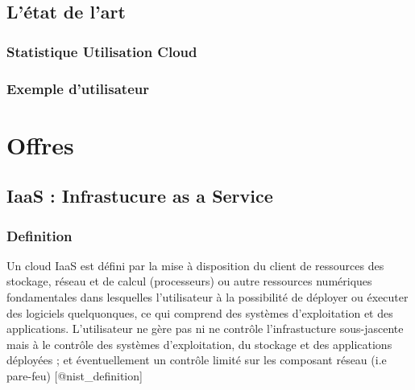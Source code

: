 \documentclass[11pt]{book}
\begin{document}
\subsection{L'état de l'art}\label{sec-ltat-de-lart}%

\subsubsection{Statistique Utilisation Cloud}\label{sec-statistique-utilisation-cloud}%

\subsubsection{Exemple d'utilisateur}\label{sec-exemple-dutilisateur}%

\section{Offres}\label{sec-offres}%

\subsection{IaaS : Infrastucure as a Service}\label{sec-iaas---infrastucure-as-a-service}%

\subsubsection{Definition}\label{sec-definition}%

\noindent{}Un cloud IaaS est défini par la mise à disposition du client de ressources des stockage,
réseau et de calcul (processeurs) ou autre ressources numériques fondamentales dans lesquelles
l'utilisateur à la possibilité de déployer ou éxecuter des logiciels quelquonques, ce qui comprend des 
systèmes d'exploitation et des applications. L'utilisateur ne gère pas ni ne contrôle l'infrastucture
sous-jascente mais à le contrôle des systèmes d'exploitation, du stockage et des applications déployées ;
et éventuellement un contrôle limité sur les composant réseau (i.e pare-feu) [@nist\_definition]%
\end{document}

